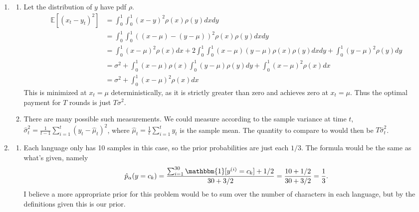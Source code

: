 \documentclass[a4paper]{article}
\theoremstyle{definition}
\def\E{\mathbb E}
\def\one{\mathbbm{1}}
\begin{document}
\begin{enumerate}
	\item \begin{enumerate}
		\item Let the distribution of $ y $ have pdf $ \rho $.
		\begin{align*}
			\E[(x_t - y_t)^2] &= \int_{0}^{1} \int_{0}^{1} (x-y)^2 \rho(x) \rho(y)dx dy\\
			&= \int_{0}^{1} \int_{0}^{1} ((x-\mu)-(y-\mu))^2 \rho(x) \rho(y)dx dy\\
			&= \int_{0}^{1} (x-\mu)^2 \rho(x) dx + 2\int_{0}^{1} \int_{0}^{1} (x-\mu)(y-\mu) \rho(x) \rho(y)dx dy + \int_{0}^{1} (y-\mu)^2 \rho(y) dy\\
			&= \sigma^2 + \int_{0}^{1} (x-\mu)\rho(x) \int_{0}^{1} (y-\mu)\rho(y) dy + \int_{0}^{1} (x-\mu)^2 \rho(x) dx\\
			&= \sigma^2 + \int_{0}^{1} (x-\mu)^2 \rho(x) dx
		\end{align*}
	This is minimized at $ x_t=\mu $ deterministically, as it is strictly greater than zero and achieves zero at $ x_t=\mu $. Thus the optimal payment for $ T $ rounds is just $ T\sigma^2 $.
	\item There are many possible such measurements. We could measure according to the sample variance at time $ t $, $ \hat \sigma_t^2 = \frac{1}{t-1}\sum_{i=1}^t (y_t-\hat{\mu}_t)^2 $, where $ \hat \mu_t = \frac{1}{t}\sum_{i=1}^t y_t $ is the sample mean. The quantity to compare to would then be $ T\hat{\sigma}_t^2 $.
	\end{enumerate}
	
	
	\item 
	\begin{enumerate}
		\item Each language only has 10 samples in this case, so the prior probabilities are just each $ 1/3 $. The formula would be the same as what's given, namely
		\[ \hat p_\alpha(y= c_k) = \dfrac{\sum_{i=1}^{30} \one[y^{(i)}=c_k] + 1/2}{30 + 3/2} = \dfrac{10 + 1/2}{30 + 3/2} = \dfrac{1}{3}. \]
		I believe a more appropriate prior for this problem would be to sum over the number of characters in each language, but by the definitions given this is our prior.
		

\end{enumerate}
\end{enumerate}
\end{document}

